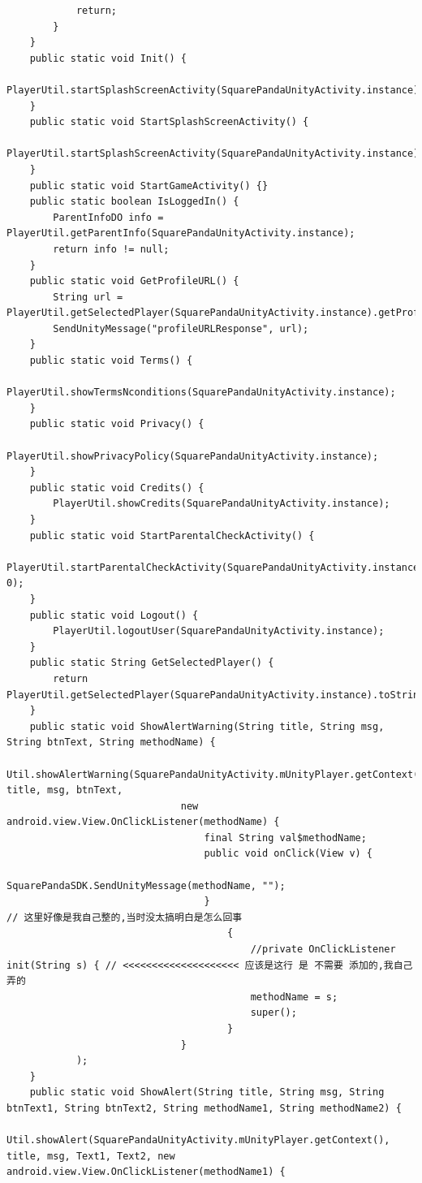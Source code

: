 \documentclass[9pt, b5paper]{article}
\begin{document}
\begin{verbatim}
            return;
        }
    }
    public static void Init() {
        PlayerUtil.startSplashScreenActivity(SquarePandaUnityActivity.instance);
    }
    public static void StartSplashScreenActivity() {
        PlayerUtil.startSplashScreenActivity(SquarePandaUnityActivity.instance);
    }
    public static void StartGameActivity() {}
    public static boolean IsLoggedIn() {
        ParentInfoDO info = PlayerUtil.getParentInfo(SquarePandaUnityActivity.instance);
        return info != null;
    }
    public static void GetProfileURL() {
        String url = PlayerUtil.getSelectedPlayer(SquarePandaUnityActivity.instance).getProfileURL();
        SendUnityMessage("profileURLResponse", url);
    }
    public static void Terms() {
        PlayerUtil.showTermsNconditions(SquarePandaUnityActivity.instance);
    }
    public static void Privacy() {
        PlayerUtil.showPrivacyPolicy(SquarePandaUnityActivity.instance);
    }
    public static void Credits() {
        PlayerUtil.showCredits(SquarePandaUnityActivity.instance);
    }
    public static void StartParentalCheckActivity() {
        PlayerUtil.startParentalCheckActivity(SquarePandaUnityActivity.instance, 0);
    }
    public static void Logout() {
        PlayerUtil.logoutUser(SquarePandaUnityActivity.instance);
    }
    public static String GetSelectedPlayer() {
        return PlayerUtil.getSelectedPlayer(SquarePandaUnityActivity.instance).toString();
    }
    public static void ShowAlertWarning(String title, String msg, String btnText, String methodName) {
        Util.showAlertWarning(SquarePandaUnityActivity.mUnityPlayer.getContext(), title, msg, btnText,
                              new android.view.View.OnClickListener(methodName) {
                                  final String val$methodName; 
                                  public void onClick(View v) {
                                      SquarePandaSDK.SendUnityMessage(methodName, "");
                                  }
// 这里好像是我自己整的,当时没太搞明白是怎么回事                                  
                                      {
                                          //private OnClickListener init(String s) { // <<<<<<<<<<<<<<<<<<<< 应该是这行 是 不需要 添加的,我自己弄的
                                          methodName = s;
                                          super();
                                      }
                              }
            );
    }
    public static void ShowAlert(String title, String msg, String btnText1, String btnText2, String methodName1, String methodName2) {
        Util.showAlert(SquarePandaUnityActivity.mUnityPlayer.getContext(), title, msg, Text1, Text2, new android.view.View.OnClickListener(methodName1) {

\end{verbatim}
\end{document}
